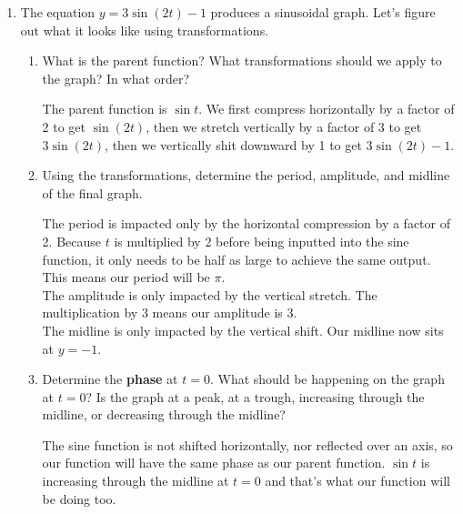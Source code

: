 \documentclass[main]{subfiles}
\begin{document}
\begin{enumerate}[resume]

\item

    The equation $y=3\sin(2t)-1$ produces a sinusoidal graph. Let's figure out what it looks like using transformations.
\begin{enumerate}
\item 
\begin{problem}
What is the parent function? What transformations should we apply to the graph? In what order?
\end{problem}
\pspace{\vfill}
\begin{solution} The parent function is $\sin t$. We first compress horizontally by a factor of 2 to get $\sin(2t)$, then we stretch vertically by a factor of 3 to get $3\sin(2t)$, then we vertically shit downward by 1 to get $3\sin(2t)-1$.
\end{solution}
\item 
\begin{problem}
Using the transformations, determine the period, amplitude, and midline of the final graph. 
\end{problem}
\pspace{\vfill}
\begin{solution}
    The period is impacted only by the horizontal compression by a factor of 2. Because $t$ is multiplied by 2 before being inputted into the sine function, it only needs to be half as large to achieve the same output. This means our period will be $\pi$.\\
    The amplitude is only impacted by the vertical stretch. The multiplication by 3 means our amplitude is 3.\\
    The midline is only impacted by the vertical shift. Our midline now sits at $y=-1$.
\end{solution}

\item
\begin{problem}
Determine the \textbf{phase} at $t=0$. What should be happening on the graph at $t=0$? Is the graph at a peak, at a trough, increasing through the midline, or decreasing through the midline?
\end{problem}

\pspace{\vfill}
\begin{solution} 
The sine function is not shifted horizontally, nor reflected over an axis, so our function will have the same phase as our parent function. $\sin t$ is increasing through the midline at $t=0$ and that's what our function will be doing too.
\end{solution}


\end{enumerate}
\end{enumerate}
\end{document}
